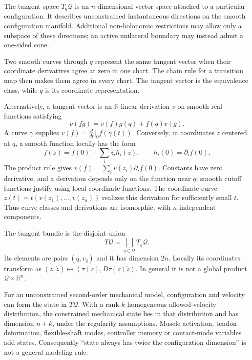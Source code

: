 The tangent space $T_q\mathcal Q$ is an $n$-dimensional vector space attached to a particular configuration. It describes unconstrained instantaneous directions on the smooth configuration manifold. Additional non-holonomic restrictions may allow only a subspace of these directions; an active unilateral boundary may instead admit a one-sided cone.

Two smooth curves through $q$ represent the same tangent vector when their coordinate derivatives agree at zero in one chart. The chain rule for a transition map then makes them agree in every chart. The tangent vector is the equivalence class, while $\dot q$ is its coordinate representation.

Alternatively, a tangent vector is an $\mathbb R$-linear derivation $v$ on smooth real functions satisfying
\begin{equation}
 v(fg)=v(f)g(q)+f(q)v(g).
\end{equation}
A curve $\gamma$ supplies $v(f)=\frac{d}{dt}|_0 f(\gamma(t))$. Conversely, in coordinates $z$ centered at $q$, a smooth function locally has the form
\begin{equation}
 f(z)=f(0)+\sum_i z_i h_i(z),\qquad h_i(0)=\partial_i f(0).
\end{equation}
The product rule gives $v(f)=\sum_i v(z_i)\partial_i f(0)$. Constants have zero derivative, and a derivation depends only on the function near $q$; smooth cutoff functions justify using local coordinate functions. The coordinate curve $z(t)=t(v(z_1),\ldots,v(z_n))$ realizes this derivation for sufficiently small $t$. Thus curve classes and derivations are isomorphic, with $n$ independent components.

The tangent bundle is the disjoint union
\begin{equation}
 T\mathcal Q=\bigsqcup_{q\in\mathcal Q}T_q\mathcal Q.
\end{equation}
Its elements are pairs $(q,v_q)$ and it has dimension $2n$. Locally its coordinates transform as $(z,\dot z)\mapsto(\tau(z),D\tau(z)\dot z)$. In general it is not a global product $\mathcal Q\times\mathbb R^n$.

For an unconstrained second-order mechanical model, configuration and velocity can form the state in $T\mathcal Q$. With a rank-$k$ homogeneous allowed-velocity distribution, the constrained mechanical state lies in that distribution and has dimension $n+k$, under the regularity assumptions. Muscle activation, tendon deformation, flexible-shaft modes, controller memory or contact-mode variables add states. Consequently ``state always has twice the configuration dimension'' is not a general modeling rule.

